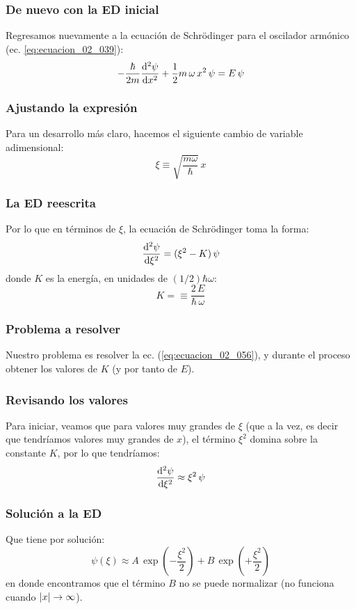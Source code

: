 \documentclass[12pt]{beamer}
\begin{document}
\begin{frame}
\frametitle{De nuevo con la ED inicial}
Regresamos nuevamente a la ecuación de Schrödinger para el oscilador armónico (ec. \ref{eq:ecuacion_02_039}):
\pause
\begin{align*}
- \dfrac{\hbar}{2 m} \dv[2]{\psi}{x} + \dfrac{1}{2} m \, \omega \, x^{2} \, \psi = E \, \psi  
\end{align*}
\end{frame}
\begin{frame}
\frametitle{Ajustando la expresión}
Para un desarrollo más claro, hacemos el siguiente cambio de variable adimensional:
\pause
\begin{equation}
\xi \equiv \sqrt{ \dfrac{m \omega}{\hbar}} \, x
\label{eq:ecuacion_02_055}
\end{equation}
\end{frame}
\begin{frame}
\frametitle{La ED reescrita}
Por lo que en términos de $\xi$, la ecuación de Schrödinger toma la forma:
\pause
\begin{equation}
\dv[2]{\psi}{\xi} = (\xi^{2} - K) \, \psi
\label{eq:ecuacion_02_056}
\end{equation}
donde $K$ es la energía, en unidades de $(1/2) \hbar \omega$:
\pause
\begin{equation}
K = \equiv \dfrac{2 \, E}{\hbar \, \omega}
\label{eq:ecuacion_02_057}
\end{equation}
\end{frame}
\begin{frame}
\frametitle{Problema a resolver}
Nuestro problema es resolver la ec. (\ref{eq:ecuacion_02_056}), y durante el proceso obtener los valores  de $K$ (y por tanto de $E$).
\end{frame}
\begin{frame}
\frametitle{Revisando los valores}
Para iniciar, veamos que para valores muy grandes de $\xi$ (que a la vez, es decir que tendríamos valores muy grandes de $x$), \pause el término $\xi^{2}$ domina sobre la constante $K$, por lo que tendríamos:
\pause
\begin{equation}
\dv[2]{\psi}{\xi} \approx \xi^{2} \, \psi
\label{eq:ecuacion_02_058}
\end{equation}
\end{frame}
\begin{frame}
\frametitle{Solución a la ED}
Que tiene por solución:
\pause
\begin{equation}
\psi (\xi) \approx A \, \exp \left( - \dfrac{\xi^{2}}{2} \right) + B \, \exp \left( + \dfrac{\xi^{2}}{2} \right)
\label{eq:ecuacion_02_059}
\end{equation}
\pause
en donde encontramos que el término $B$ no se puede normalizar (no funciona cuando $\abs{x} \to \infty$).
\end{frame}
\end{document}
